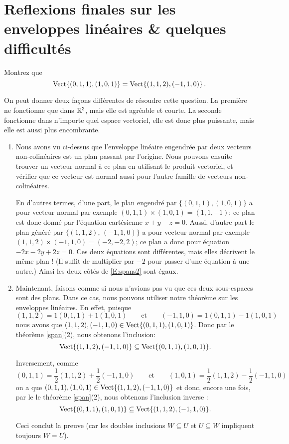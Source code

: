 \section{Reflexions finales sur les enveloppes linéaires \& quelques difficultés}

\begin{myprob} Montrez que
\begin{equation}\label{E:spans2}
\textrm{Vect}\{(0,1,1),(1,0,1)\} = \textrm{Vect}\{(1,1,2), (-1,1,0)\}\,.
\end{equation}

\begin{mysol} On peut donner deux façons différentes de résoudre cette question. La première
ne fonctionne que dans $\mathbb{R}^3$, mais elle est agréable et courte.  La seconde
fonctionne dans n'importe quel espace vectoriel, elle est donc plus puissante, mais elle est aussi plus encombrante.

\begin{enumerate}
	\item Nous avons vu ci-dessus que l'enveloppe linéaire engendrée par deux vecteurs non-colinéaires est
un plan passant par l'origine.  Nous pouvons ensuite trouver un vecteur normal à ce
plan en utilisant le produit vectoriel, et vérifier que ce vecteur est normal aussi pour l'autre famille de vecteurs non-colinéaires.

En d'autres termes, d'une part, le plan engendré par $\{ (0,1,1),(1,0,1)\}$ a pour vecteur normal par exemple
$(0,1,1)\times(1,0,1) = (1,1,-1)$; ce plan est donc donné
par l'équation cartésienne $x+y-z=0$.  Aussi, d'autre part le plan généré par $\{(1,1,2),\, (-1,1,0)\}$
a pour vecteur normal par exemple $ (1,1,2)\times (-1,1,0)=(-2,-2,2)$; ce plan a donc pour équation $-2x-2y+2z=0$.  Ces deux équations sont différentes, mais elles décrivent le même
plan !  (Il suffit de multiplier par $-2$ pour passer d'une équation à une autre.) Ainsi les deux côtés de \eqref{E:spans2} sont égaux.

	\item Maintenant, faisons comme si nous n'avions pas vu que ces deux sous-espaces sont des plans.
Dans ce cas, nous pouvons utiliser notre théorème sur les enveloppes linéaires. En effet, puisque
$$
(1,1,2) = 1(0,1,1)+1(1,0,1) \qquad \textrm{et}\qquad
(-1,1,0) = 1(0,1,1)-1(1,0,1)
$$
nous avons que $(1,1,2), (-1,1,0) \in \textrm{Vect}\{(0,1,1),(1,0,1)\}$.
Donc par le théorème \ref{span}(2), nous obtenons l'inclusion: $$\textrm{Vect}\{(1,1,2), (-1,1,0) \} \subseteq \textrm{Vect}\{(0,1,1),(1,0,1)\}.$$

Inversement, comme
$$
(0,1,1) = \frac12(1,1,2) + \frac12(-1,1,0) \qquad \textrm{et}\qquad
(1,0,1) = \frac12(1,1,2) - \frac12(-1,1,0)
$$
on a que $(0,1,1),(1,0,1) \in \textrm{Vect}\{(1,1,2), (-1,1,0) \}$ et donc, encore une fois, par le
le théorème \ref{span}(2), nous obtenons l'inclusion inverse : $$\textrm{Vect}\{(0,1,1),(1,0,1)\} \subseteq \textrm{Vect}\{(1,1,2), (-1,1,0) \}.$$

Ceci conclut la preuve (car les doubles inclusions $W \subseteq U$
et $U \subseteq W$ impliquent toujours $W = U$).
\end{enumerate}
\end{mysol} \end{myprob}


